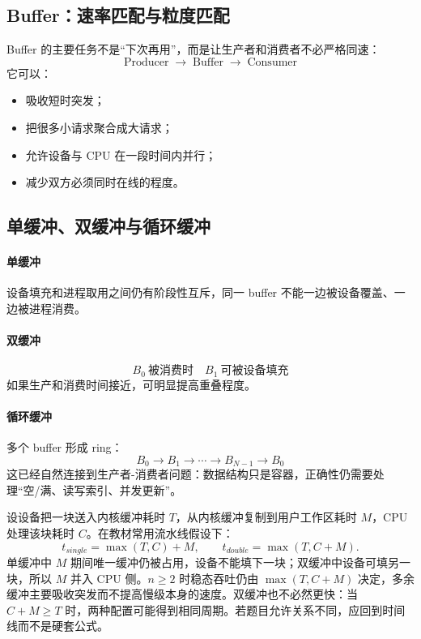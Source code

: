 \documentclass[UTF8,fontset=fandol,11pt,a4paper]{ctexart}
\newcommand{\arr}{\;\longrightarrow\;}
\begin{document}
\subsection{Buffer：速率匹配与粒度匹配}
Buffer 的主要任务不是“下次再用”，而是让生产者和消费者不必严格同速：
\[
\text{Producer}\arr\boxed{\text{Buffer}}\arr\text{Consumer}
\]
它可以：
\begin{itemize}
  \item 吸收短时突发；
  \item 把很多小请求聚合成大请求；
  \item 允许设备与 CPU 在一段时间内并行；
  \item 减少双方必须同时在线的程度。
\end{itemize}

\subsection{单缓冲、双缓冲与循环缓冲}
\paragraph{单缓冲}
设备填充和进程取用之间仍有阶段性互斥，同一 buffer 不能一边被设备覆盖、一边被进程消费。

\paragraph{双缓冲}
\[
B_0\ \text{被消费时}\quad B_1\ \text{可被设备填充}
\]
如果生产和消费时间接近，可明显提高重叠程度。

\paragraph{循环缓冲}
多个 buffer 形成 ring：
\[
B_0\to B_1\to\cdots\to B_{N-1}\to B_0
\]
这已经自然连接到生产者-消费者问题：数据结构只是容器，正确性仍需要处理“空/满、读写索引、并发更新”。

\begin{center}

\end{center}

\begin{method}
设设备把一块送入内核缓冲耗时 $T$，从内核缓冲复制到用户工作区耗时 $M$，CPU 处理该块耗时 $C$。在教材常用流水线假设下：
\[
\boxed{t_{single}=\max(T,C)+M},\qquad
\boxed{t_{double}=\max(T,C+M)}.
\]
单缓冲中 $M$ 期间唯一缓冲仍被占用，设备不能填下一块；双缓冲中设备可填另一块，所以 $M$ 并入 CPU 侧。$n\ge2$ 时稳态吞吐仍由 $\max(T,C+M)$ 决定，多余缓冲主要吸收突发而不提高慢级本身的速度。双缓冲也不必然更快：当 $C+M\ge T$ 时，两种配置可能得到相同周期。若题目允许关系不同，应回到时间线而不是硬套公式。
\end{method}
\end{document}
